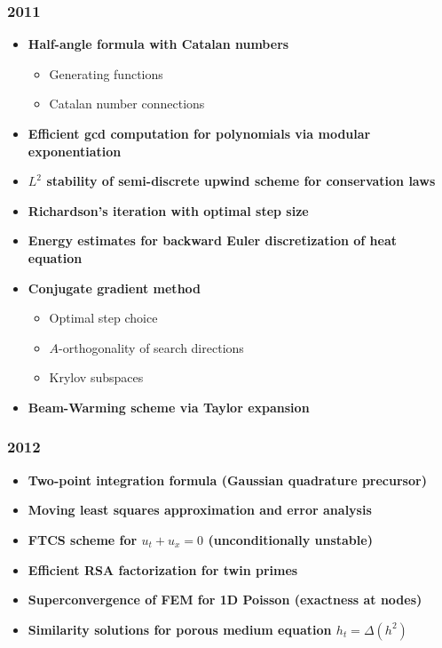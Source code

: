 \subsubsection*{2011}
\begin{itemize}
    \item \textbf{Half-angle formula with Catalan numbers}
        \begin{itemize}
            \item Generating functions
            \item Catalan number connections
        \end{itemize}
    \item \textbf{Efficient gcd computation for polynomials via modular exponentiation}
    \item \textbf{$L^2$ stability of semi-discrete upwind scheme for conservation laws}
    \item \textbf{Richardson's iteration with optimal step size}
    \item \textbf{Energy estimates for backward Euler discretization of heat equation}
    \item \textbf{Conjugate gradient method}
        \begin{itemize}
            \item Optimal step choice
            \item $A$-orthogonality of search directions
            \item Krylov subspaces
        \end{itemize}
    \item \textbf{Beam-Warming scheme via Taylor expansion}
\end{itemize}

\subsubsection*{2012}
\begin{itemize}
    \item \textbf{Two-point integration formula (Gaussian quadrature precursor)}
    \item \textbf{Moving least squares approximation and error analysis}
    \item \textbf{FTCS scheme for $u_t + u_x = 0$ (unconditionally unstable)}
    \item \textbf{Efficient RSA factorization for twin primes}
    \item \textbf{Superconvergence of FEM for 1D Poisson (exactness at nodes)}
    \item \textbf{Similarity solutions for porous medium equation $h_t = \Delta(h^2)$}
\end{itemize}

